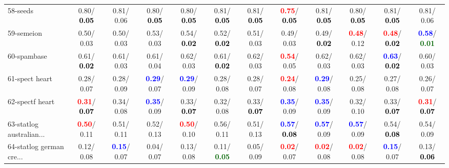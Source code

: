 \begin{table}[h]
\begin{center}
{\begin{tabular}{lc|c|c|c|c|c|c|c|c|c|c}
58-seeds &   0.80/\textcolor{black}{\textbf{  0.05}} &   0.81/  0.06 &   0.80/\textcolor{black}{\textbf{  0.05}} &   0.80/\textcolor{black}{\textbf{  0.05}} &   0.81/\textcolor{black}{\textbf{  0.05}} &   0.81/\textcolor{black}{\textbf{  0.05}} & \textcolor{red}{\textbf{  0.75}}/\textcolor{black}{\textbf{  0.05}} &   0.81/\textcolor{black}{\textbf{  0.05}} &   0.80/\textcolor{black}{\textbf{  0.05}} &   0.81/\textcolor{black}{\textbf{  0.05}} &   0.81/  0.06 \\
59-semeion &   0.50/  0.03 &   0.50/  0.03 &   0.53/  0.03 &   0.54/\textcolor{black}{\textbf{  0.02}} &   0.52/\textcolor{black}{\textbf{  0.02}} &   0.51/  0.03 &   0.49/  0.03 &   0.49/\textcolor{black}{\textbf{  0.02}} & \textcolor{red}{\textbf{  0.48}}/  0.12 & \textcolor{red}{\textbf{  0.48}}/\textcolor{black}{\textbf{  0.02}} & \textcolor{blue}{\textbf{  0.58}}/\textcolor{darkgreen}{\textbf{  0.01}} \\
60-spambase &   0.61/\textcolor{black}{\textbf{  0.02}} &   0.61/  0.03 &   0.61/  0.04 &   0.62/  0.03 &   0.61/\textcolor{black}{\textbf{  0.02}} &   0.62/  0.03 & \textcolor{red}{\textbf{  0.54}}/  0.05 &   0.62/  0.03 &   0.62/  0.03 & \textcolor{blue}{\textbf{  0.63}}/\textcolor{black}{\textbf{  0.02}} &   0.60/  0.03 \\ \hline
61-spect heart &   0.28/  0.07 &   0.28/  0.09 & \textcolor{blue}{\textbf{  0.29}}/  0.07 & \textcolor{blue}{\textbf{  0.29}}/  0.09 &   0.28/  0.08 &   0.28/  0.07 & \textcolor{red}{\textbf{  0.24}}/  0.08 & \textcolor{blue}{\textbf{  0.29}}/  0.08 &   0.25/  0.08 &   0.27/  0.08 &   0.26/  0.07 \\
62-spectf heart & \textcolor{red}{\textbf{  0.31}}/\textcolor{black}{\textbf{  0.07}} &   0.34/  0.08 & \textcolor{blue}{\textbf{  0.35}}/  0.09 &   0.33/\textcolor{black}{\textbf{  0.07}} &   0.32/  0.08 &   0.33/\textcolor{black}{\textbf{  0.07}} & \textcolor{blue}{\textbf{  0.35}}/  0.09 & \textcolor{blue}{\textbf{  0.35}}/  0.09 &   0.32/  0.10 &   0.33/\textcolor{black}{\textbf{  0.07}} & \textcolor{red}{\textbf{  0.31}}/\textcolor{black}{\textbf{  0.07}} \\
63-statlog australian... & \textcolor{red}{\textbf{  0.50}}/  0.11 &   0.51/  0.11 &   0.52/  0.13 & \textcolor{red}{\textbf{  0.50}}/  0.10 &   0.56/  0.11 &   0.51/  0.13 & \textcolor{blue}{\textbf{  0.57}}/\textcolor{black}{\textbf{  0.08}} & \textcolor{blue}{\textbf{  0.57}}/  0.09 & \textcolor{blue}{\textbf{  0.57}}/  0.09 &   0.54/\textcolor{black}{\textbf{  0.08}} &   0.54/  0.09 \\
64-statlog german cre... &   0.12/  0.08 & \textcolor{blue}{\textbf{  0.15}}/  0.07 &   0.04/  0.07 &   0.13/  0.08 &   0.11/\textcolor{darkgreen}{\textbf{  0.05}} &   0.05/  0.09 & \textcolor{red}{\textbf{  0.02}}/  0.07 & \textcolor{red}{\textbf{  0.02}}/  0.08 & \textcolor{red}{\textbf{  0.02}}/  0.08 & \textcolor{blue}{\textbf{  0.15}}/  0.07 &   0.13/\textcolor{black}{\textbf{  0.06}} \\\end{tabular}}\label{stratsALCKappa1bestReduxa}
\end{center}
\end{table}
